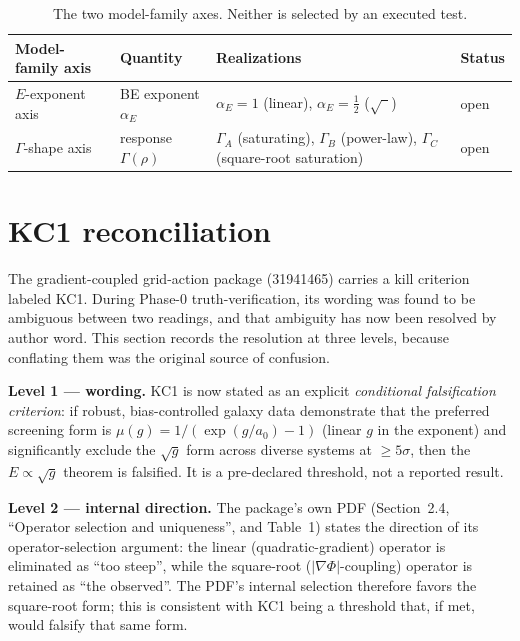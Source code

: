 \documentclass[11pt,a4paper]{article}
\begin{document}
\begin{table}[ht]
\centering
\small
\begin{tabularx}{\textwidth}{@{}>{\raggedright\arraybackslash}p{3.2cm} >{\raggedright\arraybackslash}p{2.6cm} >{\raggedright\arraybackslash}X >{\raggedright\arraybackslash}p{1.6cm}@{}}
\toprule
Model-family axis & Quantity & Realizations & Status \\
\midrule
$E$-exponent axis & BE exponent $\alpha_{E}$ & $\alpha_{E}=1$ (linear), $\alpha_{E}=\tfrac{1}{2}$ ($\sqrt{\phantom{g}}$) & open \\
$\Gamma$-shape axis & response $\Gamma(\rho)$ & $\Gamma_{A}$ (saturating), $\Gamma_{B}$ (power-law), $\Gamma_{C}$ (square-root saturation) & open \\
\bottomrule
\end{tabularx}
\caption{The two model-family axes. Neither is selected by an executed test.}
\label{tab:axes}
\end{table}

\section{KC1 reconciliation}
\label{sec:kc1}

The gradient-coupled grid-action package (31941465) carries a kill criterion labeled KC1. During Phase-0 truth-verification, its wording was found to be ambiguous between two readings, and that ambiguity has now been resolved by author word. This section records the resolution at three levels, because conflating them was the original source of confusion.

\textbf{Level 1 --- wording.} KC1 is now stated as an explicit \emph{conditional falsification criterion}: if robust, bias-controlled galaxy data demonstrate that the preferred screening form is $\mu(g) = 1/(\exp(g/a_{0}) - 1)$ (linear $g$ in the exponent) and significantly exclude the $\sqrt{g}$ form across diverse systems at $\ge 5\sigma$, then the $E \propto \sqrt{g}$ theorem is falsified. It is a pre-declared threshold, not a reported result.

\textbf{Level 2 --- internal direction.} The package's own PDF (Section~2.4, ``Operator selection and uniqueness'', and Table~1) states the direction of its operator-selection argument: the linear (quadratic-gradient) operator is eliminated as ``too steep'', while the square-root ($|\nabla\Phi|$-coupling) operator is retained as ``the observed''. The PDF's internal selection therefore favors the square-root form; this is consistent with KC1 being a threshold that, if met, would falsify that same form.
\end{document}
